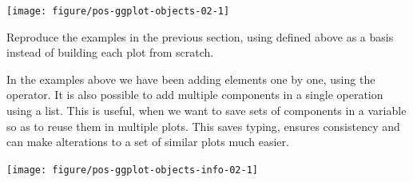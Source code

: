 \documentclass[krantz2]{krantz}\usepackage{knitr}%
\begin{document}
\begin{knitrout}\footnotesize
{}\color{fgcolor}\begin{kframe}
\begin{alltt}
 \hlopt{+}
  \hlstd{(} \hlstd{=} \hlstd{,}  \hlstd{=} \hlstd{)}
\end{alltt}
\end{kframe}

{\centering \texttt{[image: figure/pos-ggplot-objects-02-1]} 

}



\end{knitrout}

\begin{playground}
  Reproduce the examples in the previous section, using  defined above as a basis instead of building each plot from scratch.
\end{playground}

\begin{infobox}
  In the examples above we have been adding elements one by one, using the \code{+} operator. It is also possible to add multiple components in a single operation using a list. This is useful, when we want to save sets of components in a variable so as to reuse them in multiple plots. This saves typing, ensures consistency and can make alterations to a set of similar plots much easier.

\begin{knitrout}\footnotesize
{}\color{fgcolor}\begin{kframe}
\begin{alltt}
 \hlkwb{<-} \hlstd{(}
  \hlstd{(} \hlstd{=} \hlstd{,}  \hlstd{=} \hlstd{),}
  \hlstd{())}
\end{alltt}
\end{kframe}
\end{knitrout}

\begin{knitrout}\footnotesize
{}\color{fgcolor}\begin{kframe}
\begin{alltt}
 \hlopt{+} 
\end{alltt}
\end{kframe}

{\centering \texttt{[image: figure/pos-ggplot-objects-info-02-1]} 

}



\end{knitrout}

\end{infobox}
\end{document}
